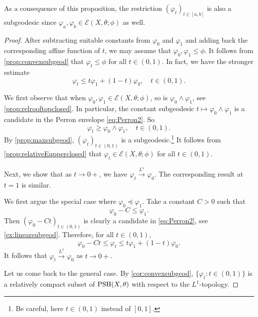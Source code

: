 As a consequence of this proposition, the restriction $(\varphi_t)_{t\in [a,b]}$ is also a subgeodesic since $\varphi_a,\varphi_b\in \mathcal{E}(X,\theta;\phi)$ as well.

\begin{proof}
    After subtracting suitable constants from $\varphi_0$ and $\varphi_1$ and adding back the corresponding affine function of $t$, we may assume that $\varphi_0,\varphi_1\leq \phi$. It follows from \cref{prop:convexsubgeod} that $\varphi_t\leq \phi$ for all $t\in (0,1)$. In fact, we have the stronger estimate
    \begin{equation}\label{eq:geodesicconvextemp1}
        \varphi_t\leq t\varphi_1+(1-t)\varphi_0,\quad t\in (0,1).
    \end{equation}

    We first observe that when $\varphi_0,\varphi_1\in \mathcal{E}(X,\theta;\phi)$, so is $\varphi_0\land \varphi_1$, see \cref{prop:relrooftopclosed}. In particular, the constant subgeodesic $t\mapsto \varphi_0\land \varphi_1$ is a candidate in the Perron envelope \eqref{eq:Perron2}. So
    \begin{equation}\label{eq:varphitgeqlandtemp1}
        \varphi_t\geq \varphi_0\land \varphi_1,\quad t\in (0,1).
    \end{equation}
    By \cref{prop:maxsubgeod}, $(\varphi_t)_{t\in (0,1)}$ is a subgeodesic.\footnote{Be careful, here $t\in (0,1)$ instead of $[0,1]$.}
    It follows from \cref{prop:relativeEupperclosed} that $\varphi_t\in \mathcal{E}(X,\theta;\phi)$ for all $t\in (0,1)$.

    Next, we show that as $t\to 0+$, we have $\varphi_t\xrightarrow{L^1}\varphi_0$. The corresponding result at $t=1$ is similar.

    We first argue the special case where $\varphi_0\preceq \varphi_1$. Take a constant $C>0$ such that
    \[
        \varphi_0-C\leq \varphi_1.
    \]
    Then $(\varphi_0-Ct)_{t\in (0,1)}$ is clearly a candidate in \eqref{eq:Perron2}, see \cref{ex:linearsubgeod}. Therefore, for all $t\in (0,1)$,
    \begin{equation}\label{eq:varphi0andvarphit}
        \varphi_0-Ct\leq \varphi_t\leq t\varphi_1+(1-t)\varphi_0.
    \end{equation}
    It follows that $\varphi_t\xrightarrow{L^1}\varphi_0$ as $t\to 0+$.

    Let us come back to the general case.
    By \cref{cor:convexsubgeod}, $\{\varphi_t:t\in (0,1)\}$ is a relatively compact subset of $\mathrm{PSH}(X,\theta)$ with respect to the $L^1$-topology.


\end{proof}
